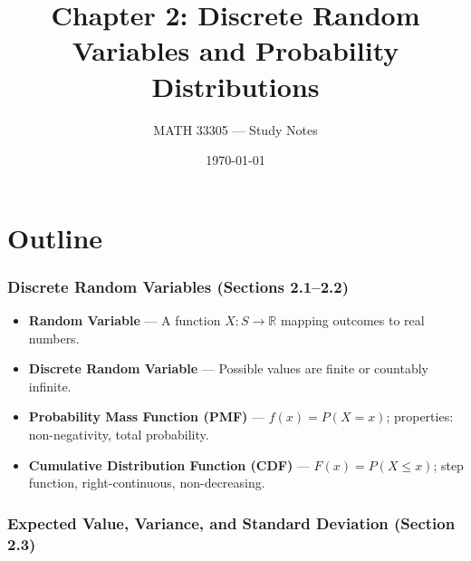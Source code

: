 \documentclass{article}
\title{Chapter 2: Discrete Random Variables and Probability Distributions}
\author{MATH 33305 --- Study Notes}
\date{\today}
\theoremstyle{remark}
\newlength{\subsecindent}
\newenvironment{secbody}{%
  \begin{list}{}{%
    \setlength{\leftmargin}{\subsecindent}%
    \setlength{\rightmargin}{0pt}%
    \setlength{\topsep}{0pt}%
    \setlength{\partopsep}{0pt}%
    \setlength{\parsep}{\parskip}%
    \setlength{\itemsep}{\parskip}%
  }\item\relax
}{\end{list}}
\newcommand{\R}{\mathbb{R}}
\begin{document}
\maketitle
\tableofcontents
\newpage

\part{Outline}
\label{part:outline}

\section{Discrete Random Variables (Sections 2.1--2.2)}

\begin{secbody}
\begin{itemize}
  \item[\textbf{A.}] \textbf{Random Variable} --- A function $X: S \to \R$ mapping outcomes to real numbers.
  \item[\textbf{B.}] \textbf{Discrete Random Variable} --- Possible values are finite or countably infinite.
  \item[\textbf{C.}] \textbf{Probability Mass Function (PMF)} --- $f(x) = P(X = x)$; properties: non-negativity, total probability.
  \item[\textbf{D.}] \textbf{Cumulative Distribution Function (CDF)} --- $F(x) = P(X \le x)$; step function, right-continuous, non-decreasing.
\end{itemize}
\end{secbody}

\section{Expected Value, Variance, and Standard Deviation (Section 2.3)}
\end{document}
